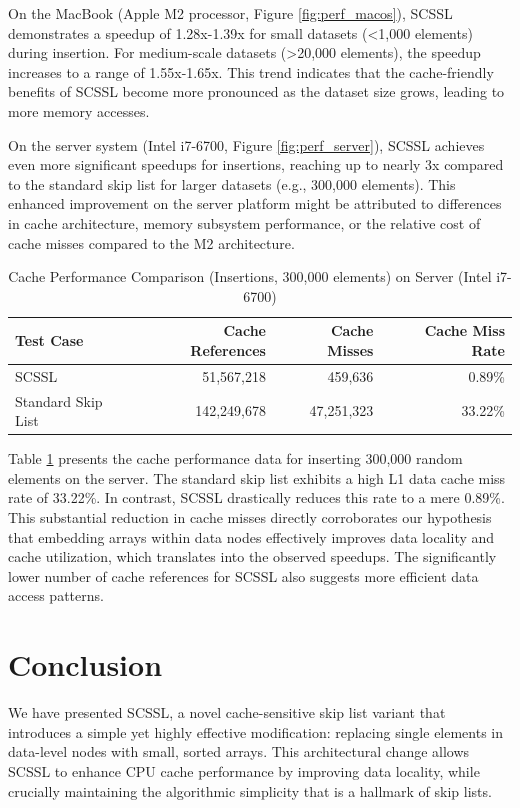 \documentclass[sigconf]{acmart}
\begin{document}
On the MacBook (Apple M2 processor, Figure \ref{fig:perf_macos}), SCSSL demonstrates a speedup of 1.28x-1.39x for small datasets (<1,000 elements) during insertion. For medium-scale datasets (>20,000 elements), the speedup increases to a range of 1.55x-1.65x. This trend indicates that the cache-friendly benefits of SCSSL become more pronounced as the dataset size grows, leading to more memory accesses.

On the server system (Intel i7-6700, Figure \ref{fig:perf_server}), SCSSL achieves even more significant speedups for insertions, reaching up to nearly 3x compared to the standard skip list for larger datasets (e.g., 300,000 elements). This enhanced improvement on the server platform might be attributed to differences in cache architecture, memory subsystem performance, or the relative cost of cache misses compared to the M2 architecture.

\begin{table}[htbp]
\centering
\caption{Cache Performance Comparison (Insertions, 300,000 elements) on Server (Intel i7-6700)}
\label{tab:cache_performance}
\begin{tabular}{@{}lrrr@{}}
\toprule
Test Case & Cache References & Cache Misses & Cache Miss Rate \\
\midrule
SCSSL & 51,567,218 & 459,636 & 0.89\% \\
Standard Skip List & 142,249,678 & 47,251,323 & 33.22\% \\
\bottomrule
\end{tabular}
\end{table}

Table \ref{tab:cache_performance} presents the cache performance data for inserting 300,000 random elements on the server. The standard skip list exhibits a high L1 data cache miss rate of 33.22\%. In contrast, SCSSL drastically reduces this rate to a mere 0.89\%. This substantial reduction in cache misses directly corroborates our hypothesis that embedding arrays within data nodes effectively improves data locality and cache utilization, which translates into the observed speedups. The significantly lower number of cache references for SCSSL also suggests more efficient data access patterns.

\section{Conclusion}
\label{sec:conclusion}

We have presented SCSSL, a novel cache-sensitive skip list variant that introduces a simple yet highly effective modification: replacing single elements in data-level nodes with small, sorted arrays. This architectural change allows SCSSL to enhance CPU cache performance by improving data locality, while crucially maintaining the algorithmic simplicity that is a hallmark of skip lists.
\end{document}
